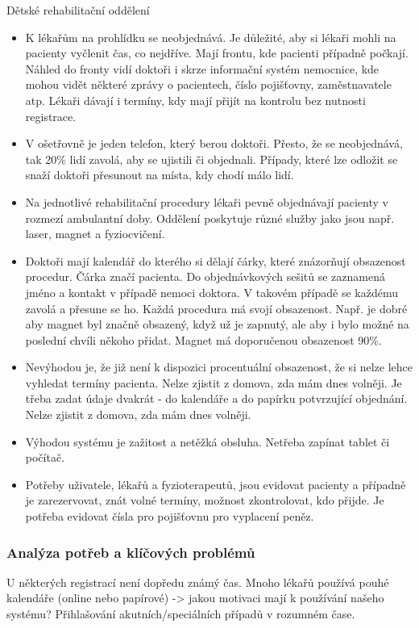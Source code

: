 Dětské rehabilitační oddělení
\begin{itemize}
    \item  K lékařům na prohlídku se neobjednává. Je důležité, aby si lékaři mohli na pacienty vyčlenit čas, co nejdříve. Mají frontu, kde pacienti případně počkají. Náhled do fronty vidí doktoři i skrze informační systém nemocnice, kde mohou vidět některé zprávy o pacientech, číslo pojišťovny, zaměstnavatele atp. Lékaři dávají i termíny, kdy mají přijít na kontrolu bez nutnosti registrace.
    \item  V ošetřovně je jeden telefon, který berou doktoři. Přesto, že se neobjednává, tak 20\% lidí zavolá, aby se ujistili či objednali. Případy, které lze odložit se snaží doktoři přesunout na místa, kdy chodí málo lidí. 
    \item  Na jednotlivé rehabilitační procedury lékaři pevně objednávají pacienty v rozmezí ambulantní doby. Oddělení poskytuje různé služby jako jsou např. laser, magnet a fyziocvičení. 
    \item  Doktoři mají kalendář do kterého si dělají čárky, které znázorňují obsazenost procedur. Čárka značí pacienta. Do objednávkových sešitů se zaznamená jméno a kontakt v případě nemoci doktora. V takovém případě se každému zavolá a přesune se ho. Každá procedura má svojí obsazenost. Např. je dobré aby magnet byl značně obsazený, když už je zapnutý, ale aby i bylo možné na poslední chvíli někoho přidat. Magnet má doporučenou obsazenost 90\%.
    \item  Nevýhodou je, že již není k dispozici procentuální obsazenost, že si nelze lehce vyhledat termíny pacienta. Nelze zjistit z domova, zda mám dnes volněji. Je třeba zadat údaje dvakrát - do kalendáře a do papírku potvrzující objednání. Nelze zjistit z domova, zda mám dnes volněji. 
    \item  Výhodou systému je zažitost a netěžká obsluha. Netřeba zapínat tablet či počítač.
    \item  Potřeby uživatele, lékařů a fyzioterapeutů, jsou evidovat pacienty a případně je zarezervovat, znát volné termíny, možnost zkontrolovat, kdo přijde. Je potřeba evidovat čísla pro pojišťovnu pro vyplacení peněz.
\end{itemize}

\subsubsection*{Analýza potřeb a klíčových problémů}

U některých registrací není dopředu známý čas. Mnoho lékařů používá pouhé kalendáře (online nebo papírové) -> jakou motivaci mají k používání našeho systému? Přihlašování akutních/speciálních případů v rozumném čase.

